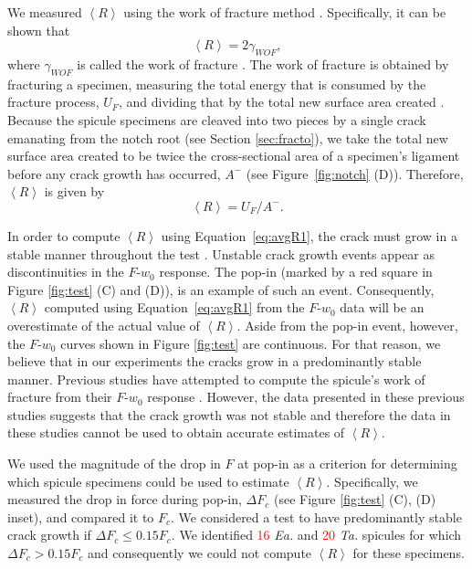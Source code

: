 \documentclass[12pt,onecolumn]{article}
\makeatletter
\newcommand{\TA}{\textit{Ta.\@}\xspace}
\newcommand{\EA}{\textit{Ea.\@}\xspace}
\makeatother
\begin{document}
\begin{bibunit}
We measured $\left< R\right>$ using the work of fracture method \cite{nakayama1981crack,sakai1992work}. Specifically, it can be shown that 
%
\begin{equation}
    \label{eq:Rwof}
    \left< R \right>=2 \gamma_{WOF},
\end{equation}
%
where $\gamma_{WOF}$ is called the work of fracture \cite{sakai1992work}. The work of fracture is obtained by fracturing a specimen, measuring the total energy that is consumed by the fracture process, $U_F$, and dividing that by the total new surface area created \cite{nakayama1981crack}. Because the spicule specimens are cleaved into two pieces by a single crack emanating from the notch root (see Section \ref{sec:fracto}), we take the total new surface area created to be twice the cross-sectional area of a specimen's ligament before any crack growth has occurred, $A^-$ (see Figure~\ref{fig:notch} (D)). Therefore, $\left< R \right>$ is given by 
%
\begin{equation}
    \label{eq:avgR1}
    \left< R \right> = U_F/A^-.
\end{equation}
%

In order to compute $\left< R \right>$ using Equation~\eqref{eq:avgR1}, the crack must grow in a stable manner throughout the test \cite{tattersall1966work,davidge1968effective}. Unstable crack growth events appear as discontinuities in the $F$-$w_0$ response. The pop-in (marked by a red square in Figure \ref{fig:test} (C) and (D)), is an example of such an event. Consequently, $\left< R \right>$ computed using Equation~\eqref{eq:avgR1} from the $F$-$w_0$ data will be an overestimate of the actual value of $\left< R \right>$. Aside from the pop-in event, however, the $F$-$w_0$ curves shown in Figure \ref{fig:test} are continuous. For that reason, we believe that in our experiments the cracks grow in a predominantly stable manner. Previous studies have attempted to compute the spicule's work of fracture from their $F$-$w_0$ response \cite{walter2007mechanisms, mayer2005rigid}. However, the data presented in these previous studies suggests that the crack growth was not stable and therefore the data in these studies cannot be used to obtain accurate estimates of $\left< R \right>$. 

We used the magnitude of the drop in $F$ at pop-in as a criterion for determining which spicule specimens could be used to estimate $\left< R\right>$. Specifically, we measured the drop in force during pop-in, $\Delta F_c$ (see Figure \ref{fig:test} (C), (D) inset), and compared it to $F_c$. We considered a test to have predominantly stable crack growth if $\Delta F_c \leq 0.15 F_c$. We identified \textcolor{red}{16} \EA and \textcolor{red}{20} \TA spicules for which $\Delta F_c > 0.15 F_c$ and consequently we could not compute $\left< R \right>$ for these specimens.


\end{bibunit}
\end{document}
